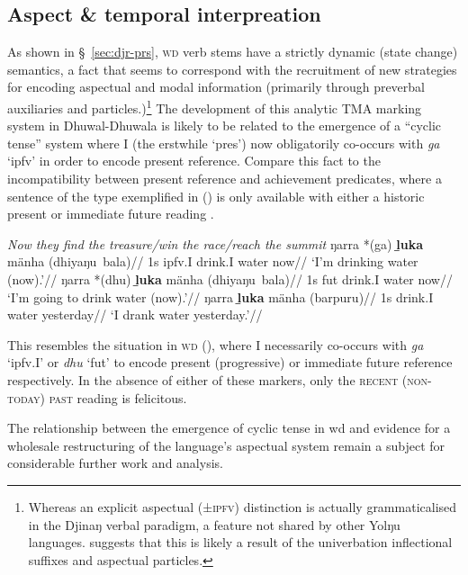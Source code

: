 \subsection{Aspect \& temporal interpreation}
As shown in \S~\ref{sec:djr-prs}, \textsc{wd} verb stems have a strictly dynamic (state change) semantics, a fact that seems to correspond with the recruitment of new strategies for encoding aspectual and modal information (primarily through preverbal auxiliaries and particles.)\footnote{Whereas an explicit aspectual (±\textsc{ipfv}) distinction is actually grammaticalised in the Djinaŋ verbal paradigm, a feature not shared by other Yolŋu languages. \citet{Bowern2009} suggests that this is likely a result of the univerbation inflectional suffixes and aspectual particles.} The development of this analytic TMA marking system in Dhuwal-Dhuwala is likely to be related to the emergence of a ``cyclic tense'' system where \gls{I} (the erstwhile `\gls{pres}') now obligatorily co-occurs with \textit{ga} `\gls{ipfv}' in order to encode present reference. Compare this fact to the incompatibility between present reference and achievement predicates, where a sentence of the type exemplified in (\nextx) is only available with either a historic present or immediate future reading \citep[an observation following][147]{Vendler1957}.


\pex\textit{Now they find the treasure/win the race/reach the summit}\xe
\pex\a\begingl\gla ŋarra *(ga) \textbf{ḻuka} mänha (dhiyaŋu~bala)//
\glb 1s \gls{ipfv}.\gls{I} drink.\gls{I} water now//
\glft`I'm drinking water (now).'\trailingcitation{[DB~20190405]}//\endgl
\a\begingl\gla ŋarra *(dhu) \textbf{ḻuka} mänha (dhiyaŋu~bala)//
\glb 1s \gls{fut} drink.\gls{I} water now//
\glft`I'm going to drink water (now).'\trailingcitation{[DB~20190405]}//\endgl
\a\begingl\gla ŋarra \textbf{ḻuka} mänha (barpuru)//
\glb 1s drink.\gls{I} water yesterday//
\glft`I drank water yesterday.'\trailingcitation{[DB~20190405]}//\endgl

\xe

This resembles the situation in \textsc{wd} (), where \gls{I} necessarily co-occurs with \textit{ga} `\gls{ipfv}.\gls{I}' or \textit{dhu} `\gls{fut}' to encode present (progressive) or immediate future reference respectively. In the absence of either of these markers, only the \textsc{recent (non-today) past} reading is felicitous.

The relationship between the emergence of cyclic tense in \gls{wd} and evidence for a wholesale restructuring of the language's aspectual system remain a subject for considerable further work and analysis.

